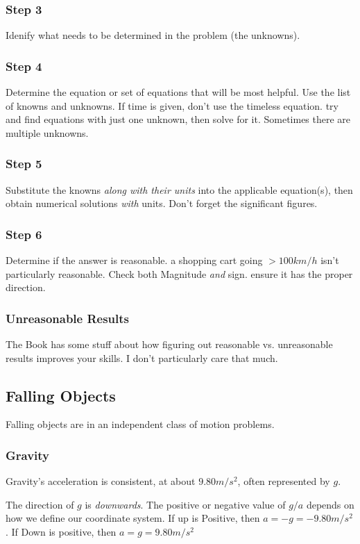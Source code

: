 \documentclass{article}
\begin{document}
\subsubsection{Step 3}
Idenify what needs to be determined in the problem (the unknowns).
\subsubsection{Step 4}
Determine the equation or set of equations that will be most helpful. Use the list of knowns and unknowns. If time is given, don't use the timeless equation. try and find equations with just one unknown, then solve for it. Sometimes there are multiple unknowns.
\subsubsection{Step 5}
Substitute the knowns \emph{along with their units} into the applicable equation(s), then obtain numerical solutions \emph{with} units. Don't forget the significant figures.
\subsubsection{Step 6}
Determine if the answer is reasonable. a shopping cart going $>100km/h$ isn't particularly reasonable. Check both Magnitude \emph{and} sign. ensure it has the proper direction.

\subsubsection{Unreasonable Results}
The Book has some stuff about how figuring out reasonable vs. unreasonable results improves your skills. I don't particularly care that much.




\subsection{Falling Objects}

Falling objects are in an independent class of motion problems.

\subsubsection{Gravity}
Gravity's acceleration is consistent, at about $9.80 m/s^2$, often represented by $g$.

The direction of $g$ is \emph{downwards}. The positive or negative value of $g/a$ depends on how we define our coordinate system. If up is Positive, then $a=-g=-9.80m/s^2$. If Down is positive, then $a=g=9.80m/s^2$
\end{document}
